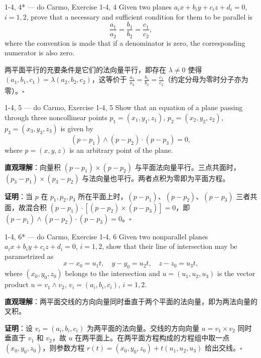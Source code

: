 \begin{exercise}{1-4, 4* — do Carmo, Exercise 1-4, 4}
Given two planes $a_i x + b_i y + c_i z + d_i = 0$, $i = 1, 2$, prove that a necessary and sufficient condition for them to be parallel is
\[
\frac{a_1}{a_2} = \frac{b_1}{b_2} = \frac{c_1}{c_2},
\]
where the convention is made that if a denominator is zero, the corresponding numerator is also zero.
\end{exercise}

\begin{solution}
两平面平行的充要条件是它们的法向量平行，即存在 $\lambda \neq 0$ 使得 $(a_1,b_1,c_1) = \lambda(a_2,b_2,c_2)$，这等价于 $\frac{a_1}{a_2} = \frac{b_1}{b_2} = \frac{c_1}{c_2}$（约定分母为零时分子亦为零）。$\square$
\end{solution}

\begin{exercise}{1-4, 5 — do Carmo, Exercise 1-4, 5}
Show that an equation of a plane passing through three noncollinear points $p_1 = (x_1, y_1, z_1)$, $p_2 = (x_2, y_2, z_2)$, $p_3 = (x_3, y_3, z_3)$ is given by
\[
(p - p_1) \wedge (p - p_2) \cdot (p - p_3) = 0,
\]
where $p = (x, y, z)$ is an arbitrary point of the plane.
\end{exercise}

\begin{solution}
\textbf{直观理解}：向量积 $(p-p_1)\times(p-p_2)$ 与平面法向量平行。三点共面时，$(p_3-p_1)\times(p_3-p_2)$ 与法向量也平行。两者点积为零即为平面方程。

\textbf{证明}：当 $p$ 在 $p_1,p_2,p_3$ 所在平面上时，$(p-p_1)$、$(p-p_2)$、$(p-p_3)$ 三者共面，故混合积 $(p-p_1)\cdot[(p-p_2)\times(p-p_3)] = 0$，即 $(p-p_1)\wedge(p-p_2)\cdot(p-p_3) = 0$。$\square$
\end{solution}

\begin{exercise}{1-4, 6* — do Carmo, Exercise 1-4, 6}
Given two nonparallel planes $a_i x + b_i y + c_i z + d_i = 0$, $i = 1, 2$, show that their line of intersection may be parametrized as
\[
x - x_0 = u_1 t, \quad y - y_0 = u_2 t, \quad z - z_0 = u_3 t,
\]
where $(x_0, y_0, z_0)$ belongs to the intersection and $u = (u_1, u_2, u_3)$ is the vector product $u = v_1 \wedge v_2$, $v_i = (a_i, b_i, c_i)$, $i = 1, 2$.
\end{exercise}

\begin{solution}
\textbf{直观理解}：两平面交线的方向向量同时垂直于两个平面的法向量，即为两法向量的叉积。

\textbf{证明}：设 $v_i = (a_i,b_i,c_i)$ 为两平面的法向量。交线的方向向量 $u = v_1 \times v_2$ 同时垂直于 $v_1$ 和 $v_2$，故 $u$ 在两平面上。在两平面方程构成的方程组中取一点 $(x_0,y_0,z_0)$，则参数方程 $r(t) = (x_0,y_0,z_0) + t(u_1,u_2,u_3)$ 给出交线。$\square$
\end{solution}

